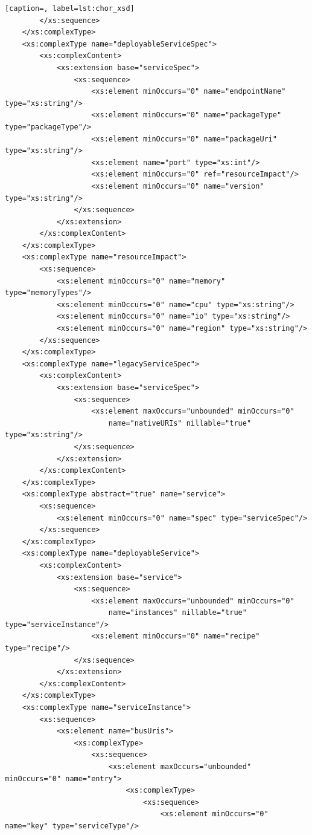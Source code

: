 \documentclass[a4paper, 10pt]{article}
\begin{document}
{\begin{lstlisting}[caption=, label=lst:chor_xsd]
        </xs:sequence>
    </xs:complexType>
    <xs:complexType name="deployableServiceSpec">
        <xs:complexContent>
            <xs:extension base="serviceSpec">
                <xs:sequence>
                    <xs:element minOccurs="0" name="endpointName" type="xs:string"/>
                    <xs:element minOccurs="0" name="packageType" type="packageType"/>
                    <xs:element minOccurs="0" name="packageUri" type="xs:string"/>
                    <xs:element name="port" type="xs:int"/>
                    <xs:element minOccurs="0" ref="resourceImpact"/>
                    <xs:element minOccurs="0" name="version" type="xs:string"/>
                </xs:sequence>
            </xs:extension>
        </xs:complexContent>
    </xs:complexType>
    <xs:complexType name="resourceImpact">
        <xs:sequence>
            <xs:element minOccurs="0" name="memory" type="memoryTypes"/>
            <xs:element minOccurs="0" name="cpu" type="xs:string"/>
            <xs:element minOccurs="0" name="io" type="xs:string"/>
            <xs:element minOccurs="0" name="region" type="xs:string"/>
        </xs:sequence>
    </xs:complexType>
    <xs:complexType name="legacyServiceSpec">
        <xs:complexContent>
            <xs:extension base="serviceSpec">
                <xs:sequence>
                    <xs:element maxOccurs="unbounded" minOccurs="0"
                        name="nativeURIs" nillable="true" type="xs:string"/>
                </xs:sequence>
            </xs:extension>
        </xs:complexContent>
    </xs:complexType>
    <xs:complexType abstract="true" name="service">
        <xs:sequence>
            <xs:element minOccurs="0" name="spec" type="serviceSpec"/>
        </xs:sequence>
    </xs:complexType>
    <xs:complexType name="deployableService">
        <xs:complexContent>
            <xs:extension base="service">
                <xs:sequence>
                    <xs:element maxOccurs="unbounded" minOccurs="0"
                        name="instances" nillable="true" type="serviceInstance"/>
                    <xs:element minOccurs="0" name="recipe" type="recipe"/>
                </xs:sequence>
            </xs:extension>
        </xs:complexContent>
    </xs:complexType>
    <xs:complexType name="serviceInstance">
        <xs:sequence>
            <xs:element name="busUris">
                <xs:complexType>
                    <xs:sequence>
                        <xs:element maxOccurs="unbounded" minOccurs="0" name="entry">
                            <xs:complexType>
                                <xs:sequence>
                                    <xs:element minOccurs="0" name="key" type="serviceType"/>

\end{lstlisting}}
\end{document}
